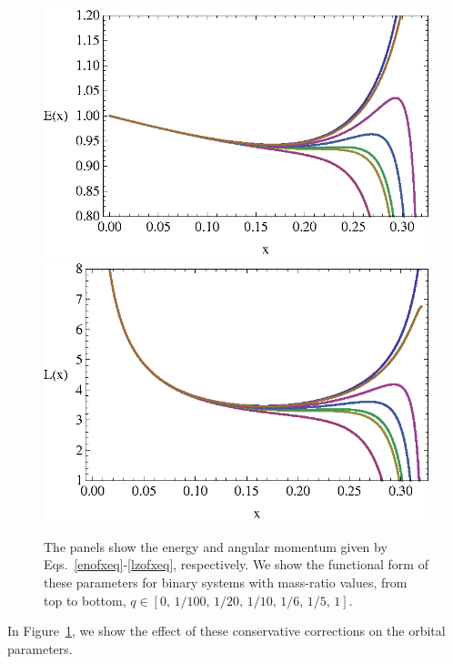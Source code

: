 \begin{figure}%
\includegraphics[height=0.6\columnwidth,  clip]{figures/imrimri/eofx.eps}
\includegraphics[height=0.6\columnwidth,  clip]{figures/imrimri/lofx.eps}
\caption{The panels show the energy and angular momentum given by Eqs.~\eqref{enofxeq}-\eqref{lzofxeq}, respectively. We show the functional form of these parameters for binary systems with mass-ratio values, from top to bottom, \(q \in [0,\, 1/100, \,1/20, \,1/10, \,1/6, \,1/5, \,1 ]\).  }
\label{orbitalparams}
\end{figure}

\noindent In Figure~\ref{orbitalparams}, we  show the effect of these conservative corrections on the orbital parameters.


